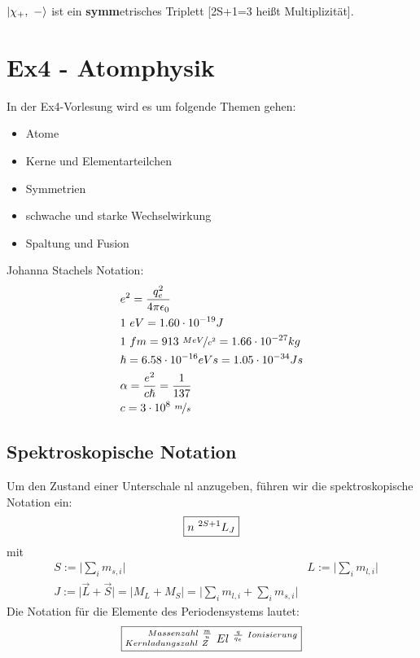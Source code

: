\documentclass[Ex4_Zusammenfassung.tex]{subfiles}
\begin{document}
$\ket{\chi_+,\ -}$ ist ein \textbf{symm}etrisches Triplett [2S+1=3 heißt Multiplizität].

\chapter{ Ex4 - Atomphysik}

In der Ex4-Vorlesung wird es um folgende Themen gehen:

\begin{itemize}
\item Atome
\item Kerne und Elementarteilchen
\item Symmetrien
\item schwache und starke Wechselwirkung
\item Spaltung und Fusion 
\end{itemize}
Johanna Stachels Notation: 
\begin{align*}
& e^2 = \frac{q_e^2}{4\pi \epsilon_{0}}  \\
& 1 \ eV = 1.60 \cdot 10^{-19} J  \\
& 1 \ fm = 913 \ \nicefrac{MeV}{c^2} = 1.66 \cdot 10^{-27} kg \\
& \hslash = 6.58 \cdot 10^{-16} eVs = 1.05 \cdot 10^{-34} Js \\
&\alpha = \frac {e^2}{c \hslash} = \frac{1}{137} \\
&c = 3 \cdot 10^8 \  \nicefrac{m}{s} \\
\end{align*}

\section{Spektroskopische Notation}
Um den Zustand einer Unterschale nl anzugeben, führen wir die spektroskopische Notation ein: 
\begin{equation}
\centering \boxed{ n \ ^{2S+1}L_J }
\end{equation}
mit
\begin{align*}
&S := \lvert \sum_{i} m_{s,i} \rvert 
&L:=  \lvert \sum_{i} m_{l,i} \rvert \\
&J := \lvert \vec L + \vec S \rvert   = \lvert M_L + M_S \rvert   = \lvert \sum_{i} m_{l,i} + \sum_{i} m_{s,i}  \rvert 
\end{align*}
\newline
Die Notation für die Elemente des Periodensystems lautet: 
\begin{equation}
\centering \boxed{^{\qquad Massenzahl \  \frac{m}{u} } _{Kernladungszahl \  Z} \  El ^{\ \frac{q}{q_e} \  Ionisierung}} 
\end{equation}
\end{document}
